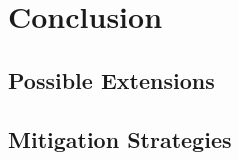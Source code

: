 \chapter{Conclusion}
\label{ch:end}

%
%
\section{Possible Extensions}
\label{sec:end:RA}

%
%
\section{Mitigation Strategies}
\label{sec:end:Summary}
